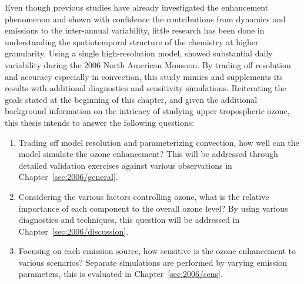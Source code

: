 Even though previous studies have already investigated the enhancement phenomenon and shown
with confidence the contributions from dynamics and emissions to the inter-annual variability, little
research has been done in understanding the spatiotemporal structure of the chemistry at higher granularity.
Using a single high-resolution model, \citet{Barth:2012qf} showed substantial daily variability during the
2006 North American Monsoon. By trading off resolution and accuracy especially in convection, this
study mimics \citet{Barth:2012qf} and supplements its results with additional diagnostics and sensitivity
simulations. Reiterating the goals stated at the beginning of this chapter, and given the additional
background information on the intricacy of studying upper tropospheric ozone, this thesis intends to
answer the following questions:
\begin{enumerate}
\item{} Trading off model resolution and parameterizing convection, how well can the model simulate the
ozone enhancement? This will be addressed through detailed validation exercises against various
observations in Chapter~\ref{sec:2006/general}.
\item{} Considering the various factors controlling ozone, what is the relative importance of each component
to the overall ozone level? By using various diagnostics and techniques, this question will be addressed
in Chapter~\ref{sec:2006/discussion}.
\item{} Focusing on each emission source, how sensitive is the ozone enhancement to various scenarios?
Separate simulations are performed by varying emission parameters, this is evaluated in Chapter~\ref{sec:2006/sens}.
\end{enumerate}

